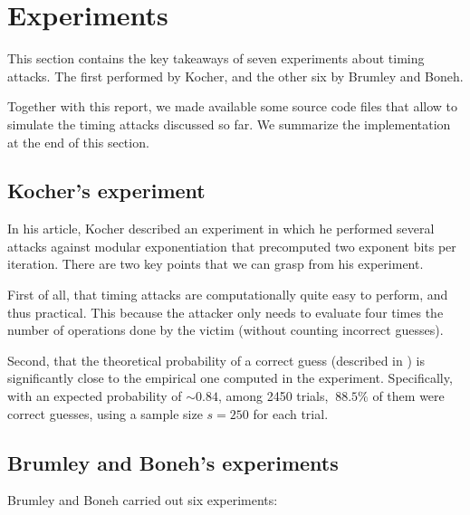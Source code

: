 \section{Experiments}

This section contains the key takeaways of seven experiments about timing attacks. The first performed by Kocher, and the other six by Brumley and Boneh.

Together with this report, we made available some source code files that allow to simulate the timing attacks discussed so far. We summarize the implementation at the end of this section.

\subsection{Kocher's experiment}

In his article, Kocher described an experiment in which he performed several attacks against modular exponentiation that precomputed two exponent bits per iteration. There are two key points that we can grasp from his experiment.

First of all, that timing attacks are computationally quite easy to perform, and thus practical. This because the attacker only needs to evaluate four times the number of operations done by the victim (without counting incorrect guesses).

Second, that the theoretical probability of a correct guess (described in ) is significantly close to the empirical one computed in the experiment. Specifically, with an expected probability of $\sim 0.84$, among 2450 trials, $~88.5\%$ of them were correct guesses, using a sample size $s = 250$ for each trial.

\subsection{Brumley and Boneh's experiments}

Brumley and Boneh carried out six experiments:

